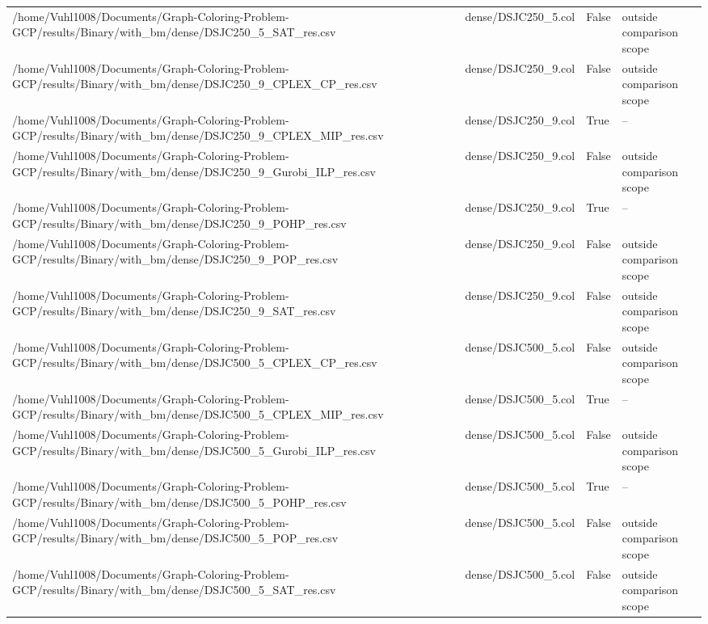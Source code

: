 \begin{table}[htbp]
\begin{tabular}{llll}
/home/Vuhl1008/Documents/Graph-Coloring-Problem-GCP/results/Binary/with\_bm/dense/DSJC250\_5\_SAT\_res.csv & dense/DSJC250\_5.col & False & outside comparison scope \\
/home/Vuhl1008/Documents/Graph-Coloring-Problem-GCP/results/Binary/with\_bm/dense/DSJC250\_9\_CPLEX\_CP\_res.csv & dense/DSJC250\_9.col & False & outside comparison scope \\
/home/Vuhl1008/Documents/Graph-Coloring-Problem-GCP/results/Binary/with\_bm/dense/DSJC250\_9\_CPLEX\_MIP\_res.csv & dense/DSJC250\_9.col & True & -- \\
/home/Vuhl1008/Documents/Graph-Coloring-Problem-GCP/results/Binary/with\_bm/dense/DSJC250\_9\_Gurobi\_ILP\_res.csv & dense/DSJC250\_9.col & False & outside comparison scope \\
/home/Vuhl1008/Documents/Graph-Coloring-Problem-GCP/results/Binary/with\_bm/dense/DSJC250\_9\_POHP\_res.csv & dense/DSJC250\_9.col & True & -- \\
/home/Vuhl1008/Documents/Graph-Coloring-Problem-GCP/results/Binary/with\_bm/dense/DSJC250\_9\_POP\_res.csv & dense/DSJC250\_9.col & False & outside comparison scope \\
/home/Vuhl1008/Documents/Graph-Coloring-Problem-GCP/results/Binary/with\_bm/dense/DSJC250\_9\_SAT\_res.csv & dense/DSJC250\_9.col & False & outside comparison scope \\
/home/Vuhl1008/Documents/Graph-Coloring-Problem-GCP/results/Binary/with\_bm/dense/DSJC500\_5\_CPLEX\_CP\_res.csv & dense/DSJC500\_5.col & False & outside comparison scope \\
/home/Vuhl1008/Documents/Graph-Coloring-Problem-GCP/results/Binary/with\_bm/dense/DSJC500\_5\_CPLEX\_MIP\_res.csv & dense/DSJC500\_5.col & True & -- \\
/home/Vuhl1008/Documents/Graph-Coloring-Problem-GCP/results/Binary/with\_bm/dense/DSJC500\_5\_Gurobi\_ILP\_res.csv & dense/DSJC500\_5.col & False & outside comparison scope \\
/home/Vuhl1008/Documents/Graph-Coloring-Problem-GCP/results/Binary/with\_bm/dense/DSJC500\_5\_POHP\_res.csv & dense/DSJC500\_5.col & True & -- \\
/home/Vuhl1008/Documents/Graph-Coloring-Problem-GCP/results/Binary/with\_bm/dense/DSJC500\_5\_POP\_res.csv & dense/DSJC500\_5.col & False & outside comparison scope \\
/home/Vuhl1008/Documents/Graph-Coloring-Problem-GCP/results/Binary/with\_bm/dense/DSJC500\_5\_SAT\_res.csv & dense/DSJC500\_5.col & False & outside comparison scope \\

\end{tabular}
\end{table}
